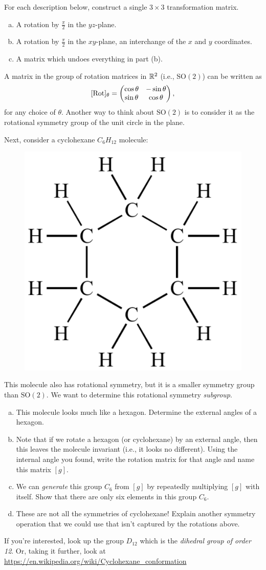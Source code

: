 \documentclass[12pt]{article} %
\begin{document}
\begin{problem}
For each description below, construct a single $3\times 3$ transformation matrix.
\begin{enumerate}[(a)]
    \item A rotation by $\frac{\pi}{2}$ in the $yz$-plane.
    \item A rotation by $\frac{\pi}{2}$ in the $xy$-plane, an interchange of the $x$ and $y$ coordinates.
    \item A matrix which undoes everything in part (b).
\end{enumerate}
\end{problem}

\begin{problem}
A matrix in the group of rotation matrices in $\mathbb{R}^2$ (i.e., $\mathrm{SO}(2)$) can be written as
\[
[\mathrm{Rot}]_\theta = \begin{pmatrix} \cos \theta & - \sin \theta \\ \sin \theta & \cos \theta \end{pmatrix},
\]
for any choice of $\theta$. Another way to think about $\mathrm{SO}(2)$ is to consider it as the rotational symmetry group of the unit circle in the plane.

Next, consider a cyclohexane $C_6H_{12}$ molecule:
    \begin{figure}[H]
        \centering
        \includegraphics[width=.3\textwidth]{cyclohexane-500x500.png}
    \end{figure}
    \noindent This molecule also has rotational symmetry, but it is a smaller symmetry group than $\mathrm{SO}(2)$. We want to determine this rotational symmetry \emph{subgroup}.
\begin{enumerate}[(a)]
    \item This molecule looks much like a hexagon. Determine the external angles of a hexagon.
    \item Note that if we rotate a hexagon (or cyclohexane) by an external angle, then this leaves the molecule invariant (i.e., it looks no different). Using the internal angle you found, write the rotation matrix for that angle and name this matrix $[g]$.
    \item We can \emph{generate} this group $C_6$ from $[g]$ by repeatedly multiplying $[g]$ with itself.  Show that there are only six elements in this group $C_6$.
    \item These are not all the symmetries of cyclohexane! Explain another symmetry operation that we could use that isn't captured by the rotations above.
\end{enumerate}
If you're interested, look up the group $D_{12}$ which is the \emph{dihedral group of order 12}. Or, taking it further, look at \url{https://en.wikipedia.org/wiki/Cyclohexane_conformation}
\end{problem}
\end{document}
